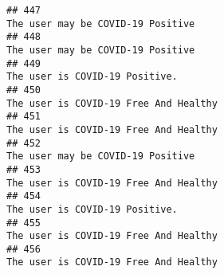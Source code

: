 \documentclass[
]{article}
\begin{document}
\begin{verbatim}
## 447                                                                                                                                                                                                                                  The user may be COVID-19 Positive
## 448                                                                                                                                                                                                                                  The user may be COVID-19 Positive
## 449                                                                                                                                                                                                                                     The user is COVID-19 Positive.
## 450                                                                                                                                                                                                                              The user is COVID-19 Free And Healthy
## 451                                                                                                                                                                                                                              The user is COVID-19 Free And Healthy
## 452                                                                                                                                                                                                                                  The user may be COVID-19 Positive
## 453                                                                                                                                                                                                                              The user is COVID-19 Free And Healthy
## 454                                                                                                                                                                                                                                     The user is COVID-19 Positive.
## 455                                                                                                                                                                                                                              The user is COVID-19 Free And Healthy
## 456                                                                                                                                                                                                                              The user is COVID-19 Free And Healthy

\end{verbatim}
\end{document}
